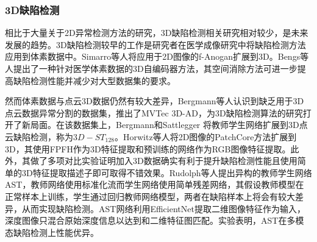 \subsubsection{3D缺陷检测}

相比于大量关于2D异常检测方法的研究，3D缺陷检测相关研究相对较少，是未来发展的趋势。3D缺陷检测较早的工作是研究者在医学成像研究中将缺陷检测方法应用到体素数据中。Simarro等人\cite{simarrovianaUnsupervised3DBrain2021}将应用于2D图像的f-Anogan\cite{schleglFAnoGANFastUnsupervised2019}扩展到3D。Bengs等人\cite{bengsThreedimensionalDeepLearning2021}提出了一种针对医学体素数据的3D自编码器方法，其空间消除方法可进一步提高缺陷检测性能并减少对大型数据集的要求。

然而体素数据与点云3D数据仍然有较大差异，Bergmann等人\cite{bergmannMVTec3DADDataset2022}认识到缺乏用于3D点云数据异常分割的数据集，推出了MVTec 3D-AD，为3D缺陷检测算法的研究打开了新局面。在该数据集上，Bergmann和Sattlegger \cite{bergmannAnomalyDetection3D2023}将教师学生网络扩展到3D点云缺陷检测，称为$3D-ST_{128}$。Horwitz等人\cite{horwitzBackFeatureClassical2022}将2D图像的PatchCore方法扩展到3D，其使用FPFH作为3D特征提取和预训练的网络作为RGB图像特征提取。此外，其做了多项对比实验证明加入3D数据确实有利于提升缺陷检测性能且使用简单的3D特征提取描述子即可取得不错效果。Rudolph等人\cite{rudolphAsymmetricStudentTeacherNetworks2022}提出异构的教师学生网络AST，教师网络使用标准化流而学生网络使用简单残差网络，其假设教师模型在正常样本上训练，学生通过回归教师网络模型，两者在缺陷样本上将会有较大差异，从而实现缺陷检测。AST网络利用EfficientNet提取二维图像特征作为输入，深度图像只混合原始深度信息以达到和二维特征图匹配。实验表明，AST在多模态缺陷检测上性能优异。





